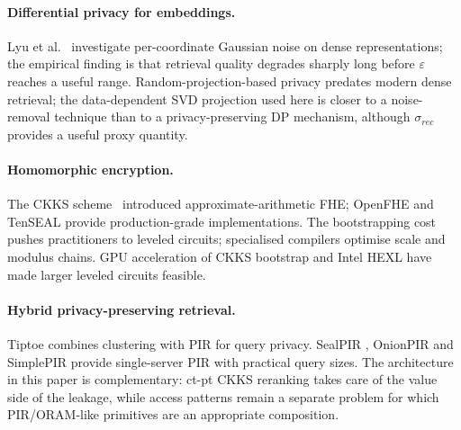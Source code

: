 \documentclass[11pt,a4paper]{article}
\begin{document}
\paragraph{Differential privacy for embeddings.} Lyu et al.~\cite{ref_lyu}
investigate per-coordinate Gaussian noise on dense representations; the
empirical finding is that retrieval quality degrades sharply long before
$\varepsilon$ reaches a useful range. Random-projection-based privacy
\cite{ref_liu,ref_kenthapadi} predates modern dense retrieval; the
data-dependent SVD projection used here is closer to a noise-removal
technique than to a privacy-preserving DP mechanism, although
$\sigma_{rec}$ provides a useful proxy quantity.

\paragraph{Homomorphic encryption.} The CKKS scheme~\cite{ref_ckks}
introduced approximate-arithmetic FHE; OpenFHE \cite{ref_openfhe} and
TenSEAL provide production-grade implementations.
The bootstrapping cost \cite{ref_ckks_bootstrap} pushes practitioners
to leveled circuits; specialised compilers \cite{ref_eva,ref_chet}
optimise scale and modulus chains.
GPU acceleration of CKKS bootstrap \cite{ref_jung_gpu} and Intel HEXL
\cite{ref_hexl} have made larger leveled circuits feasible.

\paragraph{Hybrid privacy-preserving retrieval.} Tiptoe \cite{ref_tiptoe}
combines clustering with PIR for query privacy. SealPIR
\cite{ref_sealpir}, OnionPIR \cite{ref_onionpir} and SimplePIR
\cite{ref_simplepir} provide single-server PIR with practical query sizes.
The architecture in this paper is complementary: ct-pt CKKS reranking
takes care of the value side of the leakage, while access patterns
remain a separate problem for which PIR/ORAM-like primitives are an
appropriate composition.
\end{document}
